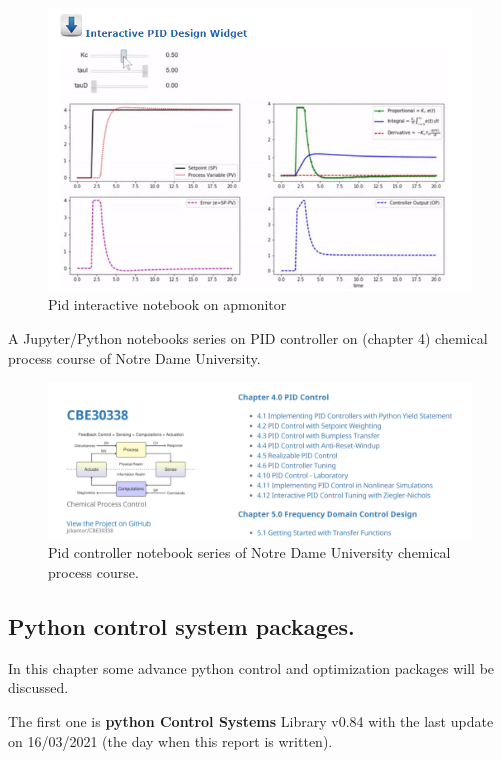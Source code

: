 \begin{figure}[H]
	\centering
	\includegraphics[width=0.8\columnwidth]{Figures/PID_interactive.png}
	\caption[Short title]{Pid interactive notebook on apmonitor}
	\label{figure:interactive notebook}
\end{figure}

\newpage

A Jupyter/Python notebooks series on PID controller on (chapter 4) chemical process course of Notre Dame University\cite{CBE}.

\begin{figure}[H]
	\centering
	\includegraphics[width=0.8\columnwidth]{Figures/PID_NotreDame.png}
	\caption[Short title]{Pid controller notebook series of Notre Dame University chemical process course.}
	\label{figure:NotreDame notebook}
\end{figure}

\subsection{Python control system packages.}

In this chapter some advance python control and optimization packages will be discussed.

The first one is \textbf{python Control Systems} Library v0.84 \cite{Control_Lib} \cite{GitControl_Lib} with the last update on 16/03/2021 (the day when this report is written).

